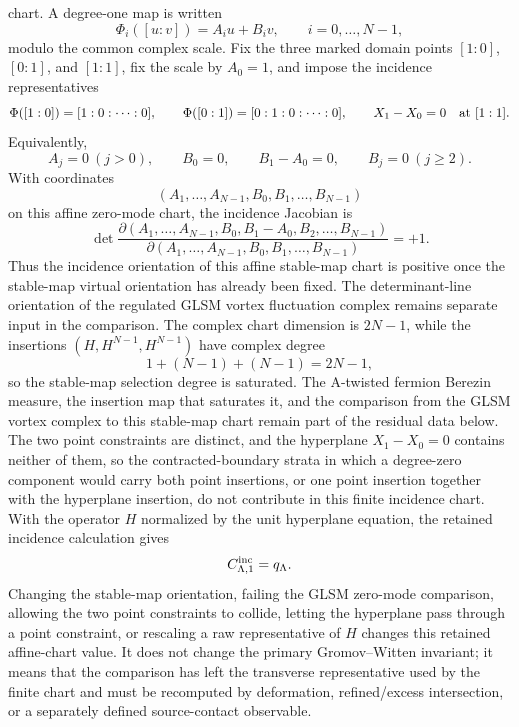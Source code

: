 \begin{remark}
chart.  A degree-one map is written
\[
  \Phi_i([u:v])=A_i u+B_i v,
  \qquad i=0,\ldots,N-1,
\]
modulo the common complex scale.  Fix the three marked domain points
\([1:0]\), \([0:1]\), and \([1:1]\), fix the scale by \(A_0=1\), and impose the
incidence representatives
\[
  \Phi([1:0])=[1:0:\cdots:0],
  \qquad
  \Phi([0:1])=[0:1:0:\cdots:0],
  \qquad
  X_1-X_0=0\quad\hbox{at }[1:1].
\]
Equivalently,
\[
  A_j=0\ (j>0),\qquad
  B_0=0,\qquad
  B_1-A_0=0,\qquad
  B_j=0\ (j\ge2).
\]
With coordinates
\[
  (A_1,\ldots,A_{N-1},B_0,B_1,\ldots,B_{N-1})
\]
on this affine zero-mode chart, the incidence Jacobian is
\[
  \det
  \frac{
    \partial(A_1,\ldots,A_{N-1},B_0,B_1-A_0,B_2,\ldots,B_{N-1})
  }{
    \partial(A_1,\ldots,A_{N-1},B_0,B_1,\ldots,B_{N-1})
  }
  =+1 .
\]
Thus the incidence orientation of this affine stable-map chart is positive once
the stable-map virtual orientation has already been fixed.  The determinant-line
orientation of the regulated GLSM vortex fluctuation complex remains separate
input in the comparison.
The complex chart dimension is \(2N-1\), while the insertions
\((H,H^{N-1},H^{N-1})\) have complex degree
\[
  1+(N-1)+(N-1)=2N-1,
\]
so the stable-map selection degree is saturated.  The A-twisted fermion
Berezin measure, the insertion map that saturates it, and the comparison from
the GLSM vortex complex to this stable-map chart remain part of the residual
data below.  The two point constraints are distinct, and the hyperplane
\(X_1-X_0=0\) contains neither of them, so the contracted-boundary strata in
which a degree-zero component would carry both point insertions, or one point
insertion together with the hyperplane insertion, do not contribute in this
finite incidence chart.  With the operator \(H\) normalized by the unit
hyperplane equation, the retained incidence calculation gives
\begin{equation}
  C_{\Lambda,1}^{\rm inc}
  =
  q_\Lambda .
  \label{eq:cpn-degree-one-stable-map-incidence-retained}
\end{equation}
Changing the stable-map orientation, failing the GLSM zero-mode comparison,
allowing the two point constraints to collide, letting the hyperplane pass
through a point constraint, or rescaling a raw representative of \(H\) changes
this retained affine-chart value.  It does not change the primary
Gromov--Witten invariant; it means that the comparison has left the transverse
representative used by the finite chart and must be recomputed by deformation,
refined/excess intersection, or a separately defined source-contact observable.


\end{remark}
